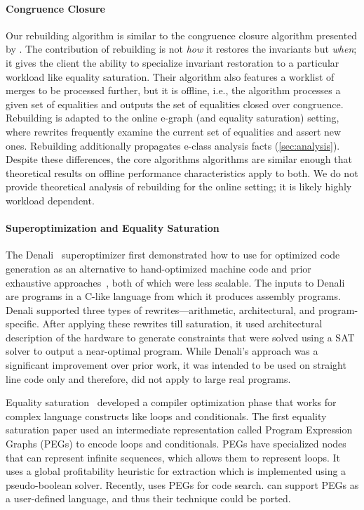 \paragraph{Congruence Closure}
Our rebuilding algorithm is similar to the congruence closure algorithm
  presented by \citet{downey-cse}.
The contribution of rebuilding is not \emph{how} it restores the \egraph invariants
  but \emph{when};
  it gives the client the ability to specialize invariant restoration to a
  particular workload like equality saturation.
Their algorithm also features a worklist of merges to be processed further,
  but it is offline, i.e.,
  the algorithm processes a given set of equalities and outputs the set of
  equalities closed over congruence.
Rebuilding is adapted to the online e-graph (and equality saturation) setting,
  where rewrites frequently examine the current set of equalities and assert new ones.
Rebuilding additionally propagates e-class analysis facts (\autoref{sec:analysis}).
Despite these differences,
  the core algorithms algorithms are similar enough that theoretical results on
  offline performance characteristics \cite{downey-cse} apply to both.
We do not provide theoretical analysis of rebuilding for the online setting;
  it is likely highly workload dependent.

\paragraph{Superoptimization and Equality Saturation}
The Denali~\cite{denali} superoptimizer first demonstrated how to use \egraphs
for optimized code generation as an alternative to hand-optimized machine code
and prior exhaustive approaches~\cite{massalin}, both of which were less
scalable. The inputs to Denali are programs in a C-like language from which it
produces assembly programs. Denali supported three types of
rewrites---arithmetic, architectural, and program-specific. After applying these
rewrites till saturation, it used architectural description of the hardware to
generate constraints that were solved using a SAT solver to output a
near-optimal program. While Denali's approach was a significant improvement over
prior work, it was intended to be used on straight line code only and therefore,
did not apply to large real programs.

Equality saturation~\cite{eqsat, eqsat-llvm} developed a compiler optimization
phase that works for complex language constructs like loops and conditionals.
The first equality saturation paper used an intermediate representation called
Program Expression Graphs (PEGs) to encode loops and conditionals. PEGs have
specialized nodes that can represent infinite sequences, which allows them to
represent loops. It uses a global profitability heuristic for extraction which
is implemented using a pseudo-boolean solver. Recently, \cite{yogo-pldi20} uses
PEGs for code search.
\egg can support PEGs as a user-defined language,
and thus their technique could be ported.

